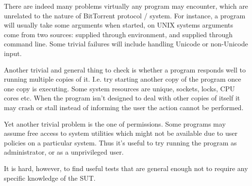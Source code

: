 \documentclass[11pt]{article}
\begin{document}
There are indeed many problems virtually any program may encounter,
which are unrelated to the nature of BitTorrent protocol / system.
For instance, a program will usually take some arguments when
started, on UNIX systems arguments come from two sources: supplied
through environment, and supplied through command line.  Some
trivial failures will include handling Unicode or non-Unicode input.

Another trivial and general thing to check is whether a program
responds well to running multiple copies of it. I.e. try starting
another copy of the program once one copy is executing.  Some system
resources are unique, sockets, locks, CPU cores etc.  When the
program isn't designed to deal with other copies of itself it may
crash or stall instead of informing the user the action cannot be
performed.

Yet another trivial problem is the one of permissions.  Some
programs may assume free access to system utilities which might not
be available due to user policies on a particular system.  Thus it's
useful to try running the program as administrator, or as a
unprivileged user.

It is hard, however, to find useful tests that are general enough
not to require any specific knowledge of the SUT.
\end{document}

